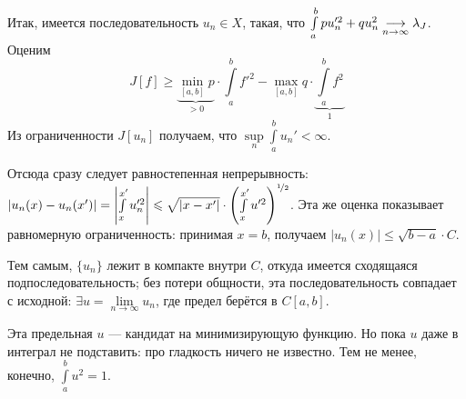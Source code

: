 \documentclass[a4paper]{article}
\begin{document}
    Итак, имеется последовательность $u_n \in X$, такая, что $\int\limits_{a}^{b}p u_n'^2 + qu_n^2 \underset{n \to \infty}{\longrightarrow} \lambda_J$.
    Оценим \[J[f] \ge \underbrace{\min\limits_{[a, b]}p}_{> 0} \cdot \int\limits_{a}^{b}f'^2 - \max\limits_{[a, b]}q \cdot \underbrace{\int\limits_{a}^{b}f^2}_{1}\]
    Из ограниченности $J[u_n]$ получаем, что $\sup\limits_{n}\int\limits_{a}^{b}u_n' < \infty$.

    Отсюда сразу следует равностепенная непрерывность: $|u_n(x) - u_n(x')| = \left|\int\limits_{x}^{x'}u'^2_n\right| \leqslant \sqrt{|x - x'|} \cdot \left(\int\limits_{x}^{x'}u'^2\right)^{\nicefrac{1}{2}}$.
    Эта же оценка показывает равномерную ограниченность: принимая $x = b$, получаем $|u_n(x)| \le \sqrt{b - a} \cdot C$.

    Тем самым, $\{u_n\}$ лежит в компакте внутри $C$, откуда имеется сходящаяся подпоследовательность;
    без потери общности, эта последовательность совпадает с исходной: $\exists u = \lim\limits_{n \to \infty}u_n$, где предел берётся в $C[a, b]$.

    Эта предельная $u$ --- кандидат на минимизирующую функцию.
    Но пока $u$ даже в интеграл не подставить: про гладкость ничего не известно.
    Тем не менее, конечно, $\int\limits_{a}^{b}u^2 = 1$.
\end{document}
